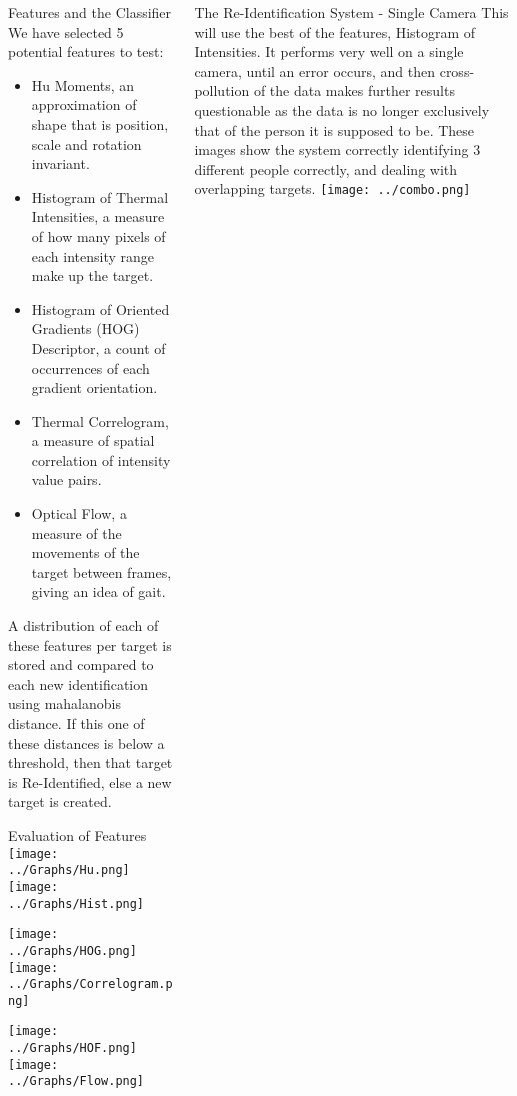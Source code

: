 \documentclass[final]{beamer}
\begin{document}
\begin{frame}{}
\begin{columns}[t]
\begin{column}{.49\linewidth}
        \begin{block}{Features and the Classifier}
        We have selected 5 potential features to test:
          \begin{itemize}
          \item Hu Moments, an approximation of shape that is position, scale and rotation invariant.
          \item Histogram of Thermal Intensities, a measure of how many pixels of each intensity range make up the target.
          \item Histogram of Oriented Gradients (HOG) Descriptor, a count of  occurrences of each gradient orientation. 
          \item Thermal Correlogram, a measure of spatial correlation of intensity value pairs.
          \item Optical Flow, a measure of the movements of the target between frames, giving an idea of gait. 
          \end{itemize}
          \justify
          A distribution of each of these features per target is stored and compared to each new identification using mahalanobis distance. If this one of these distances is below a threshold, then that target is Re-Identified, else a new target is created.
        \end{block}
	
        \begin{block}{Evaluation of Features}
        \hspace{1cm}
		\texttt{[image: ../Graphs/Hu.png]}
		\hspace{2cm}
		\texttt{[image: ../Graphs/Hist.png]}
		
		\hspace{1cm}
		\texttt{[image: ../Graphs/HOG.png]}
		\hspace{2cm}
		\texttt{[image: ../Graphs/Correlogram.png]}
		
		\hspace{1cm}
		\texttt{[image: ../Graphs/HOF.png]}
		\hspace{2cm}
		\texttt{[image: ../Graphs/Flow.png]}
		
        \end{block}
	 \end{column}
	 \begin{column}{.49\linewidth}
 		\begin{block}{The Re-Identification System - Single Camera}
 		\justify This will use the best of the features, Histogram of Intensities. It performs very well on a single camera, until an error occurs, and then cross-pollution of the data makes further results questionable as the data is no longer exclusively that of the person it is supposed to be. 
 		These images show the system correctly identifying 3 different people correctly, and dealing with overlapping targets. 
 		\justify
 		\texttt{[image: ../combo.png]}  
         

\end{block}
\end{column}
\end{columns}
\end{frame}
\end{document}
